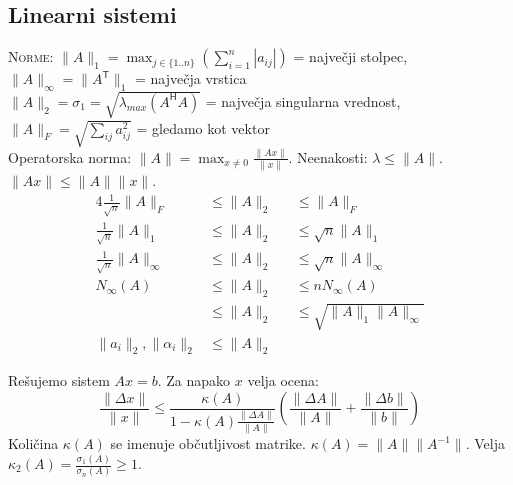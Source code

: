 \documentclass[a4paper,10pt]{article}
\theoremstyle{definition}
\newcommand{\T}{\mathsf{T}\!}
\renewcommand{\H}{\mathsf{H}\!}
\begin{document}
%
%


\subsection*{Linearni sistemi}

\textsc{Norme:} $\|A\|_1 =
\max_{j\in\{1..n\}}\left(\sum_{i=1}^n|a_{ij}|\right)$ = največji stolpec,
$\|A\|_\infty = \|A^\T\|_1$ = največja vrstica \\
$\|A\|_2 = \sigma_1 = \sqrt{\lambda_{max}(A^\H A)}$ = največja singularna vrednost,
$\|A\|_F = \sqrt{\sum_{ij}a_{ij}^2}$ = gledamo kot vektor \\
Operatorska norma: $\|A\| = \max_{x\neq 0}\frac{\|Ax\|}{\|x\|}$.
Neenakosti: $\lambda \leq \|A\|$. $\|Ax\| \leq \|A\|\|x\|$.
\begin{alignat*}{4}
\textstyle \frac{1}{\sqrt{n}}\|A\|_F &\leq \|A\|_2 &&\leq \|A\|_F \\
\textstyle \frac{1}{\sqrt{n}}\|A\|_1 &\leq \|A\|_2 &&\leq \sqrt{n} \|A\|_1 \\
\textstyle \frac{1}{\sqrt{n}}\|A\|_\infty &\leq \|A\|_2 &&\leq \sqrt{n} \|A\|_\infty \\
N_\infty(A) &\leq \|A\|_2 &&\leq nN_\infty(A) \\
            &\leq \|A\|_2 &&\leq \sqrt{\|A\|_1\|A\|_\infty} \\
\|a_i\|_2, \|\alpha_i\|_2 &\leq \|A\|_2 &&
\end{alignat*}

Rešujemo sistem $Ax=b$. Za napako $x$ velja ocena:
\[ \frac{\|\Delta x\|}{\|x\|}  \leq \frac{\kappa(A)}{1-\kappa(A) \frac{\|\Delta
A\|}{\|A\|}} \left( \frac{\|\Delta A\|}{\|A\|} + \frac{\|\Delta
b\|}{\|b\|}\right) \]
Količina $\kappa(A)$ se imenuje občutljivost matrike. $\kappa(A) =
\|A\|\|A^{-1}\|$. Velja $\kappa_2(A) = \frac{\sigma_1(A)}{\sigma_n(A)} \geq 1$.
\end{document}
